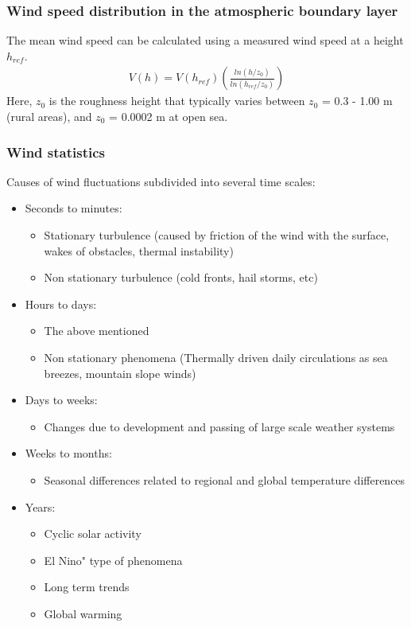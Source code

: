 \documentclass[a4paper,10pt]{article}
\begin{document}
\subsubsection{Wind speed distribution in the atmospheric boundary layer}
The mean wind speed can be calculated using a measured wind speed at a height $h_{ref}$.
\begin{align}
V(h) = V(h_{ref}) \left( \frac{ln(h/z_0)}{ln (h_{ref}/z_0)}\right)
\end{align}
Here, $z_0$ is the roughness height that typically varies between $z_0$ = 0.3 - 1.00 m (rural areas), and $z_0$ = 0.0002 m at open sea. 

\subsubsection{Wind statistics}
Causes of wind fluctuations subdivided into several time scales:
\begin{itemize}
 \item Seconds to minutes: 
 \begin{itemize}
 \item Stationary turbulence (caused by friction of the wind with the surface, wakes of obstacles, thermal instability)
 \item Non stationary turbulence (cold fronts, hail storms, etc)
 \end{itemize}
 \item Hours to days:
 \begin{itemize}
 \item The above mentioned
 \item Non stationary phenomena (Thermally driven daily circulations as sea breezes, mountain slope winds)
 \end{itemize}
 \item Days to weeks:
 \begin{itemize}
  \item Changes due to development and passing of large scale weather systems
 \end{itemize}
 \item Weeks to months:
 \begin{itemize}
  \item Seasonal differences related to regional and global temperature differences
 \end{itemize}
 \item Years:
 \begin{itemize}
  \item Cyclic solar activity 
  \item El Nino" type of phenomena 
  \item Long term trends
  \item Global warming
 \end{itemize}
\end{itemize}
\end{document}
